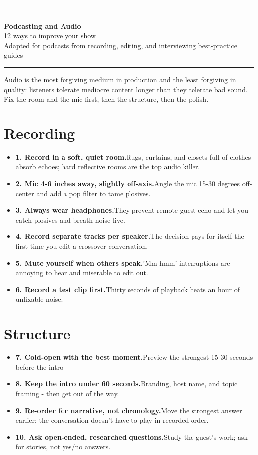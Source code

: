 \documentclass[11pt]{article}
\newcommand{\tip}[2]{\item \textbf{#1.}\enspace #2}
\newcommand{\tlabel}{\textcolor{accent}{\small$\blacktriangleright$}}
\newcommand{\footertitle}{Content Creation Playbook}
\newcommand{\docbanner}[3]{%
  \begin{center}
    {\color{accent}\rule{\textwidth}{1.4pt}}\\[10pt]
    {\Huge\bfseries\color{black} #1}\\[8pt]
    {\large\color{softgray} #2}\\[8pt]
    {\small\color{softgray} #3}\\[6pt]
    {\color{accent}\rule{\textwidth}{1.4pt}}
  \end{center}
  \vspace{6pt}
}
\begin{document}
\renewcommand{\footertitle}{Podcasting and Audio}
\docbanner{Podcasting and Audio}{12 ways to improve your show}{Adapted for podcasts from recording, editing, and interviewing best-practice guides}
\begin{tcolorbox}[colback=accent!5,colframe=accent,boxrule=0.8pt,arc=2pt,left=8pt,right=8pt,top=6pt,bottom=6pt]
\small Audio is the most forgiving medium in production and the least forgiving in quality: listeners tolerate mediocre content longer than they tolerate bad sound. Fix the room and the mic first, then the structure, then the polish.
\end{tcolorbox}
\vspace{6pt}
\section*{Recording}
\begin{itemize}[label=\tlabel]
\tip{1. Record in a soft, quiet room}{Rugs, curtains, and closets full of clothes absorb echoes; hard reflective rooms are the top audio killer.}
\tip{2. Mic 4-6 inches away, slightly off-axis}{Angle the mic 15-30 degrees off-center and add a pop filter to tame plosives.}
\tip{3. Always wear headphones}{They prevent remote-guest echo and let you catch plosives and breath noise live.}
\tip{4. Record separate tracks per speaker}{The decision pays for itself the first time you edit a crossover conversation.}
\tip{5. Mute yourself when others speak}{'Mm-hmm' interruptions are annoying to hear and miserable to edit out.}
\tip{6. Record a test clip first}{Thirty seconds of playback beats an hour of unfixable noise.}
\end{itemize}
\section*{Structure}
\begin{itemize}[label=\tlabel]
\tip{7. Cold-open with the best moment}{Preview the strongest 15-30 seconds before the intro.}
\tip{8. Keep the intro under 60 seconds}{Branding, host name, and topic framing - then get out of the way.}
\tip{9. Re-order for narrative, not chronology}{Move the strongest answer earlier; the conversation doesn't have to play in recorded order.}
\tip{10. Ask open-ended, researched questions}{Study the guest's work; ask for stories, not yes/no answers.}
\end{itemize}
\end{document}
